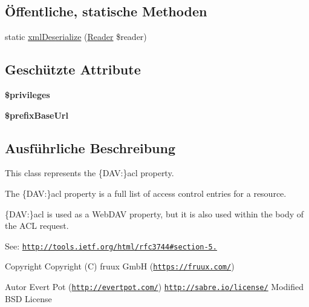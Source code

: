\subsection*{Öffentliche, statische Methoden}
\begin{DoxyCompactItemize}
\item 
static \mbox{\hyperlink{class_sabre_1_1_d_a_v_a_c_l_1_1_xml_1_1_property_1_1_acl_a0a763ca7c797f28c0e5642bd8fa942a4}{xml\+Deserialize}} (\mbox{\hyperlink{class_sabre_1_1_xml_1_1_reader}{Reader}} \$reader)
\end{DoxyCompactItemize}
\subsection*{Geschützte Attribute}
\begin{DoxyCompactItemize}
\item 
\mbox{\label{class_sabre_1_1_d_a_v_a_c_l_1_1_xml_1_1_property_1_1_acl_a959783647ae14b4668f252ba07819780}} 
{\bfseries \$privileges}
\item 
\mbox{\label{class_sabre_1_1_d_a_v_a_c_l_1_1_xml_1_1_property_1_1_acl_aaf5ebb9dbabecf834237c72d9361dde2}} 
{\bfseries \$prefix\+Base\+Url}
\end{DoxyCompactItemize}


\subsection{Ausführliche Beschreibung}
This class represents the \{D\+AV\+:\}acl property.

The \{D\+AV\+:\}acl property is a full list of access control entries for a resource.

\{D\+AV\+:\}acl is used as a Web\+D\+AV property, but it is also used within the body of the A\+CL request.

See\+: \href{http://tools.ietf.org/html/rfc3744#section-5.5}{\tt http\+://tools.\+ietf.\+org/html/rfc3744\#section-\/5.}

\begin{DoxyCopyright}{Copyright}
Copyright (C) fruux GmbH (\href{https://fruux.com/}{\tt https\+://fruux.\+com/}) 
\end{DoxyCopyright}
\begin{DoxyAuthor}{Autor}
Evert Pot (\href{http://evertpot.com/}{\tt http\+://evertpot.\+com/})  \href{http://sabre.io/license/}{\tt http\+://sabre.\+io/license/} Modified B\+SD License 
\end{DoxyAuthor}



